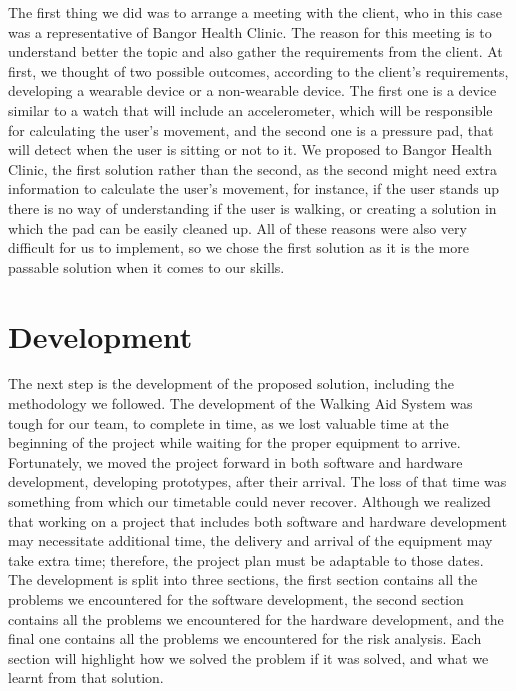     The first thing we did was to arrange a meeting with the client, who in this case was a representative of Bangor Health Clinic. The reason for this meeting is to understand better the topic and also gather the requirements from the client. At first, we thought of two possible outcomes, according to the client's requirements, developing a wearable device or a non-wearable device. The first one is a device similar to a watch that will include an accelerometer, which will be responsible for calculating the user's movement, and the second one is a pressure pad, that will detect when the user is sitting or not to it. We proposed to Bangor Health Clinic, the first solution rather than the second, as the second might need extra information to calculate the user's movement, for instance, if the user stands up there is no way of understanding if the user is walking, or creating a solution in which the pad can be easily cleaned up. All of these reasons were also very difficult for us to implement, so we chose the first solution as it is the more passable solution when it comes to our skills.

    \section{Development}
    \label{sec:development}

    The next step is the development of the proposed solution, including the methodology we followed. The development of the Walking Aid System was tough for our team, to complete in time, as we lost valuable time at the beginning of the project while waiting for the proper equipment to arrive. Fortunately, we moved the project forward in both software and hardware development, developing prototypes, after their arrival. The loss of that time was something from which our timetable could never recover. Although we realized that working on a project that includes both software and hardware development may necessitate additional time, the delivery and arrival of the equipment may take extra time; therefore, the project plan must be adaptable to those dates. The development is split into three sections, the first section contains all the problems we encountered for the software development, the second section contains all the problems we encountered for the hardware development, and the final one contains all the problems we encountered for the risk analysis. Each section will highlight how we solved the problem if it was solved, and what we learnt from that solution.

